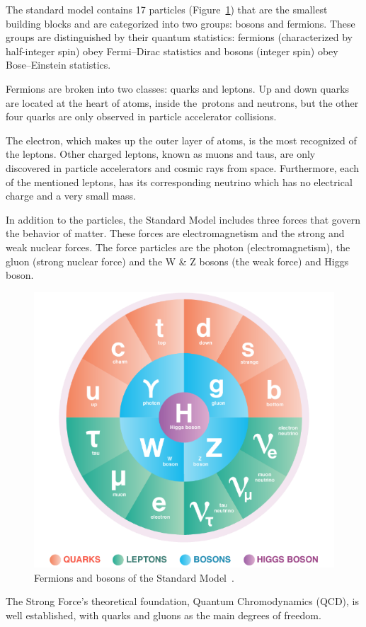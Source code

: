The standard model contains 17 particles (Figure~\ref{fig_standard})  that are the smallest building blocks and are categorized into two groups: bosons and fermions. These groups are distinguished by their quantum statistics: fermions (characterized by half-integer spin) obey Fermi–Dirac statistics and bosons (integer spin) obey Bose–Einstein statistics. 

Fermions are broken into two classes: quarks and leptons. Up and down quarks are located at the heart of atoms, inside the protons and neutrons, but the other four quarks are only observed in particle accelerator collisions.

The electron, which makes up the outer layer of atoms, is the most recognized of the leptons. Other charged leptons, known as muons and taus, are only discovered in particle accelerators and cosmic rays from space. Furthermore, each of the mentioned leptons, has its corresponding neutrino which has no electrical charge and a very small mass.

In addition to the particles, the Standard Model includes three forces that govern the behavior of matter. These forces are electromagnetism and the strong and weak nuclear forces. The force particles are the photon (electromagnetism), the gluon (strong nuclear force) and the W \& Z bosons (the weak force) and Higgs boson.

\begin{figure}[!h]
\centering
\includegraphics[width=0.65\columnwidth]{Chapter1/images/particles.png}
\caption{Fermions and bosons of the Standard Model~\cite{standard_model}.}
\label{fig_standard}
\end{figure}

The Strong Force's theoretical foundation, Quantum Chromodynamics (QCD), is well established, with quarks and gluons as the main degrees of freedom.

